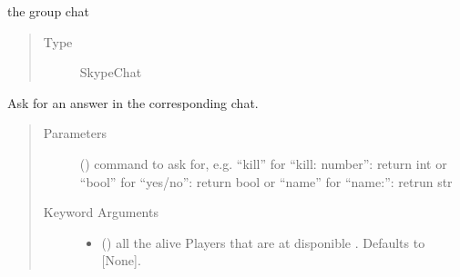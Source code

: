 \documentclass[letterpaper,10pt,english]{sphinxmanual}
\begin{document}
\begin{fulllineitems}
\begin{fulllineitems}
\end{fulllineitems}


\begin{fulllineitems}
\label{\detokenize{chatwolf:chatwolf.skypecommands.SkypeCommands.chat}}
the group chat
\begin{quote}\begin{description}
\item[{Type}] \leavevmode
SkypeChat

\end{description}\end{quote}

\end{fulllineitems}


\begin{fulllineitems}
\label{\detokenize{chatwolf:chatwolf.skypecommands.SkypeCommands.ask}}
Ask for an answer in the corresponding chat.
\begin{quote}\begin{description}
\item[{Parameters}] \leavevmode
{} () \textendash{} command to ask for, e.g. “kill” for “kill: number”: return int
or “bool” for “yes/no”: return bool
or “name” for “name:”: retrun str

\item[{Keyword Arguments}] \leavevmode\begin{itemize}
\item {} 
 (\sphinxstyleliteralemphasis{\sphinxupquote{, }}) \textendash{} all the alive Players that are at disponible . Defaults to {[}None{]}.


\end{itemize}
\end{description}
\end{quote}
\end{fulllineitems}
\end{fulllineitems}
\end{document}
